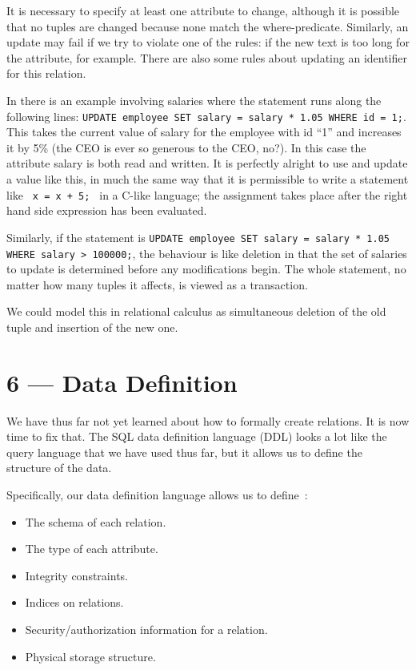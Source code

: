 \documentclass[a4paper]{report}
\begin{document}
It is necessary to specify at least one attribute to change, although it is possible that no tuples are changed because none match the where-predicate. Similarly, an update may fail if we try to violate one of the rules: if the new text is too long for the attribute, for example. There are also some rules about updating an identifier for this relation. 

In \cite{dsc} there is an example involving salaries where the statement runs along the following lines: \texttt{UPDATE employee SET salary = salary * 1.05 WHERE id = 1;}. This takes the current value of salary for the employee with id ``1'' and increases it by 5\% (the CEO is ever so generous to the CEO, no?). In this case the attribute salary is both read and written. It is perfectly alright to use and update a value like this, in much the same way that it is permissible to write a statement like \texttt{ x = x + 5; } in a C-like language; the assignment takes place after the right hand side expression has been evaluated.

Similarly, if the statement is \texttt{UPDATE employee SET salary = salary * 1.05 WHERE salary > 100000;}, the behaviour is like deletion in that the set of salaries to update is determined before any modifications begin. The whole statement, no matter how many tuples it affects, is viewed as a transaction. 


We could model this in relational calculus as simultaneous deletion of the old tuple and insertion of the new one. 










\chapter*{6 --- Data Definition}


We have thus far not yet learned about how to formally create relations. It is now time to fix that. The SQL data definition language (DDL) looks a lot like the query language that we have used thus far, but it allows us to define the structure of the data. 

Specifically, our data definition language allows us to define~\cite{dsc}:
\begin{itemize}
	\item The schema of each relation.
	\item The type of each attribute.
	\item Integrity constraints.
	\item Indices on relations.
	\item Security/authorization information for a relation.
	\item Physical storage structure.
\end{itemize}
\end{document}
